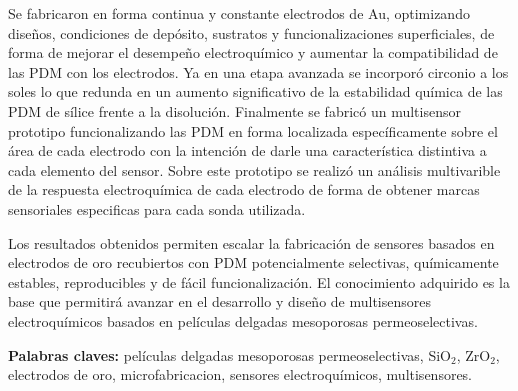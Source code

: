 
Se fabricaron en forma continua y constante electrodos de Au, optimizando diseños, condiciones de depósito, sustratos y funcionalizaciones superficiales, de forma de mejorar el desempeño electroquímico y aumentar la compatibilidad de las PDM con los electrodos. Ya en una etapa avanzada se incorporó circonio a los soles lo que redunda en un aumento significativo de la estabilidad química de las PDM de sílice frente a la disolución. Finalmente se fabricó un multisensor prototipo funcionalizando las PDM en forma localizada específicamente sobre el área de cada electrodo con la intención de darle una característica distintiva a cada elemento del sensor. Sobre este prototipo se realizó un análisis multivarible de la respuesta electroquímica de cada electrodo de forma de obtener marcas sensoriales especificas para cada sonda utilizada.

Los resultados obtenidos permiten escalar la fabricación de sensores basados en electrodos de oro recubiertos con PDM potencialmente selectivas, químicamente estables, reproducibles y de fácil funcionalización. El conocimiento adquirido es la base que permitirá avanzar en el desarrollo y diseño de multisensores electroquímicos basados en películas delgadas mesoporosas permeoselectivas. 
\vspace*{\fill}

\vfill
\noindent\textbf{Palabras claves:} películas delgadas mesoporosas permeoselectivas, SiO$_2$, ZrO$_2$, electrodos de oro, microfabricacion, sensores electroquímicos, multisensores.

\cleardoublepage
